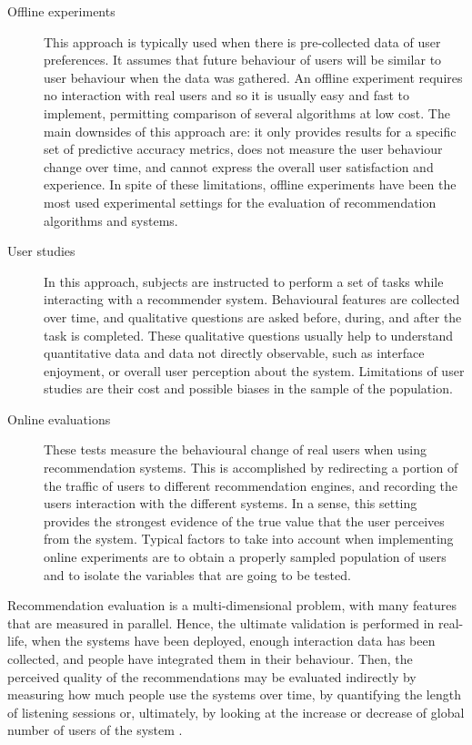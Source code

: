 \begin{description}
	\item[Offline experiments] This approach is typically used when there is pre-collected data of user preferences. It assumes that future behaviour of users will be similar to user behaviour when the data was gathered. An offline experiment requires no interaction with real users and so it is usually easy and fast to implement, permitting comparison of several algorithms at low cost. 
    The main downsides of this approach are: it only provides results for a specific set of predictive accuracy metrics, does not measure the user behaviour change over time, and cannot express the overall user satisfaction and experience. In spite of these limitations, offline experiments have been the most used experimental settings for the evaluation of recommendation algorithms and systems. 
	
	\item[User studies] In this approach, subjects are instructed to perform a set of tasks while interacting with a recommender system. Behavioural features are collected over time, and qualitative questions are asked before, during, and after the task is completed. These qualitative questions usually help to understand quantitative data and data not directly observable, such as interface enjoyment, or overall user perception about the system. Limitations of user studies are their cost and possible biases in the sample of the population. 

	\item[Online evaluations] These tests measure the behavioural change of real users when using recommendation systems. This is accomplished by redirecting a portion of the traffic of users to different recommendation engines, and recording the users interaction with the different systems. In a sense, this setting provides the strongest evidence of the true value that the user perceives from the system. Typical factors to take into account when implementing online experiments are to obtain a properly sampled population of users and to isolate the variables that are going to be tested. 
\end{description}



Recommendation evaluation is a multi-dimensional problem, with many features that are measured in parallel. Hence, the ultimate validation is performed in real-life, when the systems have been deployed, enough interaction data has been collected, and people have integrated them in their behaviour. Then, the perceived quality of the recommendations may be evaluated indirectly by measuring how much people use the systems over time, by quantifying the length of listening sessions or, ultimately, by looking at the increase or decrease of global number of users of the system \autocite{gomez15netflix}.


